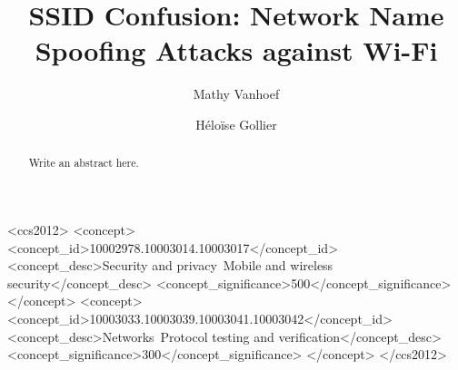 \documentclass[sigconf,review]{acmart}
\newcommand{\wifi}{\mbox{Wi-Fi}}
\begin{document}
\title{SSID Confusion: Network Name Spoofing Attacks against \wifi{}}

\author{Mathy Vanhoef}

\author{Héloïse Gollier}

\renewcommand{\shortauthors}{Mathy Vanhoef, Xianjun Jiao, Wei Liu \& Ingrid Moerman}

\begin{CCSXML}
<ccs2012>
   <concept>
       <concept_id>10002978.10003014.10003017</concept_id>
       <concept_desc>Security and privacy~Mobile and wireless security</concept_desc>
       <concept_significance>500</concept_significance>
       </concept>
   <concept>
       <concept_id>10003033.10003039.10003041.10003042</concept_id>
       <concept_desc>Networks~Protocol testing and verification</concept_desc>
       <concept_significance>300</concept_significance>
       </concept>
 </ccs2012>
\end{CCSXML}





\begin{abstract}
Write an abstract here.
\end{abstract}
\end{document}
